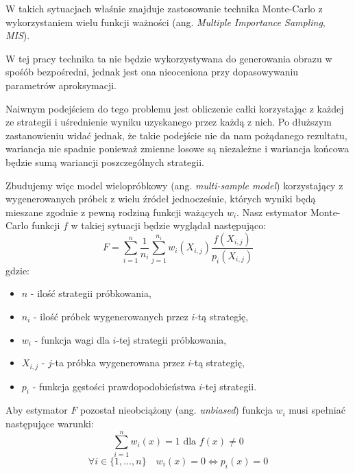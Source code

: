\documentclass[../main.tex]{subfiles}
\begin{document}
W takich sytuacjach właśnie znajduje zastosowanie technika Monte-Carlo z wykorzystaniem wielu funkcji ważności (ang. \textit{Multiple Importance Sampling}, \textit{MIS}).

W tej pracy technika ta nie będzie wykorzystywana do generowania obrazu w spośób bezpośredni, jednak jest ona nieoceniona przy dopasowywaniu parametrów aproksymacji.

Naiwnym podejściem do tego problemu jest obliczenie całki korzystając z każdej ze strategii i uśrednienie wyniku uzyskanego przez każdą z nich. Po dłuższym zastanowieniu widać jednak, że takie podejście nie da nam pożądanego rezultatu, wariancja nie spadnie ponieważ zmienne losowe są niezależne i wariancja końcowa będzie sumą wariancji poszczególnych strategii.

Zbudujemy więc model wielopróbkowy (ang. \textit{multi-sample model}) \cite{pbrt,ImportanceSamplingForProduction} korzystający z wygenerowanych próbek z wielu źródeł jednocześnie, których wyniki będą mieszane zgodnie z pewną rodziną funkcji ważących $w_i$. Nasz estymator Monte-Carlo funkcji $f$ w takiej sytuacji będzie wyglądał następująco:
\begin{equation}
  F = \sum_{i=1}^{n} \frac{1}{n_i} \sum_{j=1}^{n_i} w_{i}(X_{i,j}) \frac{
    f(X_{i,j})
  }{
    p_{i}(X_{i,j})
  }
\end{equation}
\noindent gdzie:
\begin{itemize}
	\item $n$ - ilość strategii próbkowania,
	\item $n_i$ - ilość próbek wygenerowanych przez $i$-tą strategię,
	\item $w_i$ - funkcja wagi dla $i$-tej strategii próbkowania,
	\item $X_{i,j}$ - $j$-ta próbka wygenerowana przez $i$-tą strategię,
	\item $p_i$ - funkcja gęstości prawdopodobieństwa $i$-tej strategii.
\end{itemize}

Aby estymator $F$ pozostał nieobciążony (ang. \textit{unbiased}) funkcja $w_i$ musi spełniać następujące warunki:
\begin{equation}
\sum_{i = 1}^{n} w_{i}(x) = 1 \text{ dla } f(x) \neq 0
\end{equation}
\begin{equation}
  \forall i \in \{ 1, \ldots, n \} \quad
  w_{i}(x) = 0 \Leftrightarrow p_i(x) = 0
\end{equation}
\end{document}
